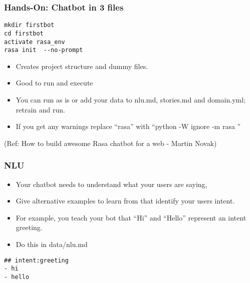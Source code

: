 


 \begin{frame}[fragile]\frametitle{Hands-On: Chatbot in 3 files}

\begin{lstlisting}
mkdir firstbot
cd firstbot
activate rasa_env
rasa init  --no-prompt
\end{lstlisting}

\begin{itemize}
\item Creates project structure and dummy files. 
\item Good to run and execute
\item You can run as is or add your data to nlu.md, stories.md and domain.yml; retrain and run.
\item If you get any warnings replace ``rasa'' with ``python -W ignore -m rasa ''
\end{itemize}

{\tiny (Ref: How to build awesome Rasa chatbot for a web - Martin Novak)}

\end{frame}

 \begin{frame}[fragile]\frametitle{NLU}

\begin{itemize}
\item Your chatbot needs to understand what your users are saying,
\item Give alternative examples to learn from that identify your users intent.
\item For example, you teach your bot that ``Hi'' and ``Hello'' represent an intent greeting. 
\item Do this in data/nlu.md
\end{itemize}


\begin{lstlisting}
## intent:greeting
- hi
- hello
\end{lstlisting}

\end{frame}

